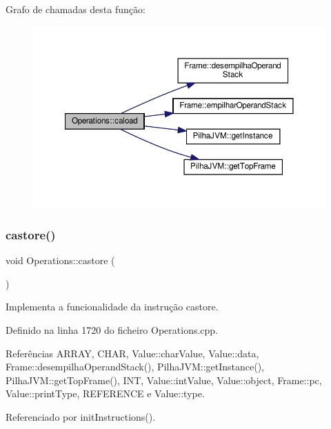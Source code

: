 Grafo de chamadas desta função\+:\nopagebreak
\begin{figure}[H]
\begin{center}
\leavevmode
\includegraphics[width=350pt]{classOperations_a4bb55ffc2ba79a76a019a0c02d29d7f9_cgraph}
\end{center}
\end{figure}
\mbox{\label{classOperations_a417c4833f2f048350920358961cfab03}} 
\subsubsection{\texorpdfstring{castore()}{castore()}}
{\footnotesize\ttfamily void Operations\+::castore (\begin{DoxyParamCaption}{ }\end{DoxyParamCaption})\hspace{0.3cm}{\ttfamily [private]}}



Implementa a funcionalidade da instrução castore. 



Definido na linha 1720 do ficheiro Operations.\+cpp.



Referências A\+R\+R\+AY, C\+H\+AR, Value\+::char\+Value, Value\+::data, Frame\+::desempilha\+Operand\+Stack(), Pilha\+J\+V\+M\+::get\+Instance(), Pilha\+J\+V\+M\+::get\+Top\+Frame(), I\+NT, Value\+::int\+Value, Value\+::object, Frame\+::pc, Value\+::print\+Type, R\+E\+F\+E\+R\+E\+N\+CE e Value\+::type.



Referenciado por init\+Instructions().

